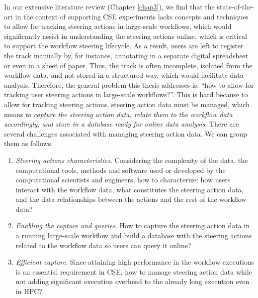 In our extensive literature review (Chapter \ref{chap3}), we find that the state-of-the-art in the context of supporting CSE experiments lacks concepts and techniques to allow for tracking steering actions in large-scale workflows, which would significantly assist in understanding the steering actions online, which is critical to support the workflow steering lifecycle. 
As a result, users are left to register the track manually by, for instance, annotating in a separate digital spreadsheet or even in a sheet of paper. Thus, the track is often incomplete, isolated from the workflow data, and not stored in a structured way, which would facilitate data analysis. 
Therefore, the general problem this thesis addresses is: ``how to allow for tracking user steering actions in large-scale workflows?''.
This is hard because to allow for tracking steering actions, steering action data must be managed, which means \textit{to capture the steering action data, relate them to the workflow data accordingly, and store in a database ready for online data analysis}. There are several challenges associated with managing steering action data. We can group them as follows.

\begin{enumerate}[label=(\Roman*),itemsep=0pt]

    \item \textit{Steering actions characteristics}.
    Considering the complexity of the data, the computational tools, methods and software used or developed by the computational scientists and engineers, how to characterize: how users interact with the workflow data, what constitutes the steering action data, and the data relationships between the actions and the rest of the workflow data?

    \item \textit{Enabling the capture and queries}.
    How to capture the steering action data in a running large-scale workflow and build a database with the steering actions related to the workflow data so users can query it online?

    \item  \textit{Efficient capture}.
    Since attaining high performance in the workflow executions is an essential requirement in CSE, how to manage steering action data while not adding significant execution overhead to the already long execution even in HPC?

\end{enumerate}

